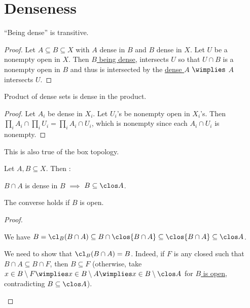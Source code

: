 \section{Denseness}

	\begin{lem}\label{LEM: denseness is transitive}
		``Being dense'' is transitive.
	\end{lem}
	
	\begin{proof}
		Let $A\subseteq B\subseteq X$ with $A$ dense in $B$ and $B$ dense in $X$. Let $U$ be a nonempty open in $X$. Then \uline{$B$ being dense}, intersects $U$ so that $U\cap B$ is a nonempty open in $B$ and thus is intersected by the \uline{dense $A$} $\wimplies$ $A$ intersects $U$.
	\end{proof}
	
	
	\begin{lem}\label{LEM: prd of dense is dense}
		Product of dense sets is dense in the product.
	\end{lem}
	
	\begin{proof}
		Let $A_i$ be dense in $X_i$. Let $U_i$'s be nonempty open in $X_i$'s. Then $\prod_i A_i\cap \prod_i U_i = \prod_i A_i\cap U_i$, which is nonempty since each $A_i\cap U_i$ is nonempty.
	\end{proof}
	
	\begin{rmk}
		This is also true of the box topology.
	\end{rmk}
	
	
	
	\begin{lem}\label{LEM: dense on a subset}
		Let $A, B\subseteq X$. Then \tfh:
		\begin{mylist}
			\item $B\cap A$ is dense in $B$ $\implies$ $B\subseteq \clos A$.
			
			\item\label{LEMii: dense on a subset} The converse holds if $B$ is open.
		\end{mylist}
	\end{lem}
	
	\begin{proof}
		\begin{mylist}
			\item We have $B = \cl_B(B\cap A)\subseteq B\cap \clos{B\cap A}\subseteq\clos{B\cap A}\subseteq\clos A$.
			
			\item We need to show that $\cl_B(B\cap A) = B$. Indeed, if $F$ is any closed such that $B\cap A\subseteq B\cap F$, then $B\subseteq F$ (otherwise, take $x\in B\setminus F\wimplies x\in B\setminus A\wimplies x\in B\setminus \clos A$ for \uline{$B$ is open}, contradicting $B\subseteq \clos A$).\qedhere
		\end{mylist}
	\end{proof}
	
